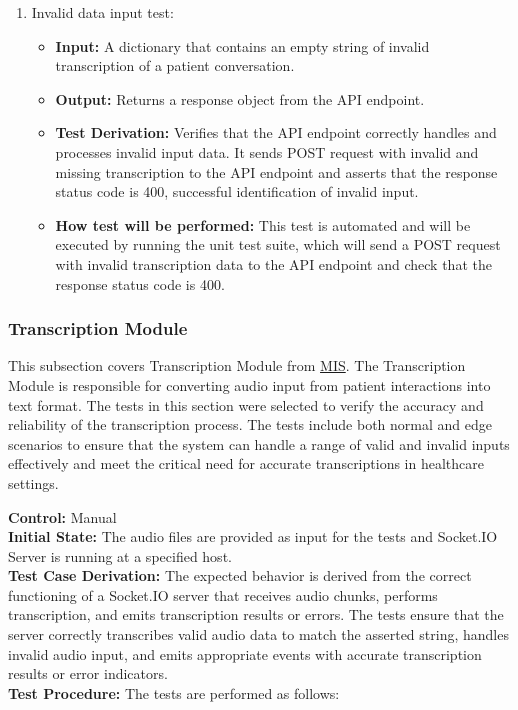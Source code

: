 \documentclass[12pt, titlepage]{article}
\begin{document}
\begin{enumerate}
  \item Invalid data input test:
    \begin{itemize}
      \item \textbf{Input:} A dictionary that contains an empty string of invalid transcription of a patient conversation.    
      \item \textbf{Output:} Returns a response object from the API endpoint.
      \item \textbf{Test Derivation:} Verifies that the API endpoint correctly handles and processes invalid input data. It sends POST request with invalid and missing transcription to the API endpoint and asserts that the response status code is 400, successful identification of invalid input.
      \item \textbf{How test will be performed:} This test is automated and will be executed by running the unit test suite, which will send a POST request with invalid transcription data to the API endpoint and check that the response status code is 400.
    \end{itemize}
\end{enumerate}

\subsubsection{Transcription Module}

This subsection covers Transcription Module from \href{https://github.com/PKALXI/RapidCare/blob/main/docs/Design/SoftDetailedDes/MIS.pdf}{MIS}. The Transcription Module is responsible for converting audio input from patient interactions into text format. The tests in this section were selected to verify the accuracy and reliability of the transcription process. The tests include both normal and edge scenarios to ensure that the system can handle a range of valid and invalid inputs effectively and meet the critical need for accurate transcriptions in healthcare settings.

\textbf{Control:} Manual\\
\textbf{Initial State:} The audio files are provided as input for the tests and Socket.IO Server is running at a specified host.\\
\textbf{Test Case Derivation:} The expected behavior is derived from the correct functioning of a Socket.IO server that receives audio chunks, performs transcription, and emits transcription results or errors. The tests ensure that the server correctly transcribes valid audio data to match the asserted string, handles invalid audio input, and emits appropriate events with accurate transcription results or error indicators.\\
\textbf{Test Procedure:} The tests are performed as follows:\\
\end{document}
